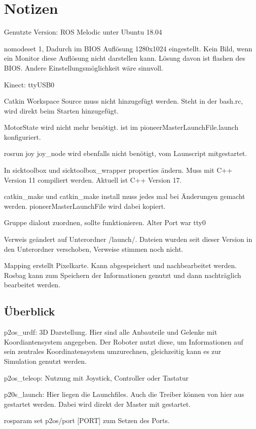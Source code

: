 \documentclass{scrartcl}%
\begin{document}
\section{Notizen}
Genutzte Version: ROS Melodic unter Ubuntu 18.04

nomodeset 1, Dadurch im BIOS Auflösung 1280x1024 eingestellt. Kein Bild, wenn ein Monitor diese Auflösung nicht darstellen kann. Lösung davon ist flashen des BIOS. Andere Einstellungsmöglichkeit wäre sinnvoll.

Kinect: ttyUSB0

Catkin Workspace Source muss nicht hinzugefügt werden. Steht in der bash.rc, wird direkt beim Starten hinzugefügt.

MotorState wird nicht mehr benötigt. ist im pioneerMasterLaunchFile.launch konfiguriert.

rosrun joy joy\_node wird ebenfalls nicht benötigt, vom Launscript mitgestartet.

In sicktoolbox und sicktoolbox\_wrapper properties ändern. Muss mit C++ Version 11 compiliert werden. Aktuell ist C++ Version 17.

catkin\_make und catkin\_make install muss jedes mal bei Änderungen gemacht werden. pioneerMasterLaunchFile wird dabei kopiert.

Gruppe dialout zuordnen, sollte funktionieren. Alter Port war tty0

Verweis geändert auf Unterordner /launch/. Dateien wurden seit dieser Version in den Unterordner verschoben, Verweise stimmen noch nicht.

Mapping erstellt Pixelkarte. Kann abgespeichert und nachbearbeitet werden. Rosbag kann zum Speichern der Informationen genutzt und dann nachträglich bearbeitet werden.

\subsection{Überblick}
p2os\_urdf: 3D Darstellung. Hier sind alle Anbauteile und Gelenke mit Koordiantensystem angegeben. Der Roboter nutzt diese, um Informationen auf sein zentrales Koordinatensystem umzurechnen, gleichzeitig kann es zur Simulation genutzt werden.

p2os\_teleop: Nutzung mit Joystick, Controller oder Tastatur

p20s\_launch: Hier liegen die Launchfiles. Auch die Treiber können von hier aus gestartet werden. Dabei wird direkt der Master mit gestartet.

rosparam set p2os/port [PORT] zum Setzen des Ports.
\end{document}
